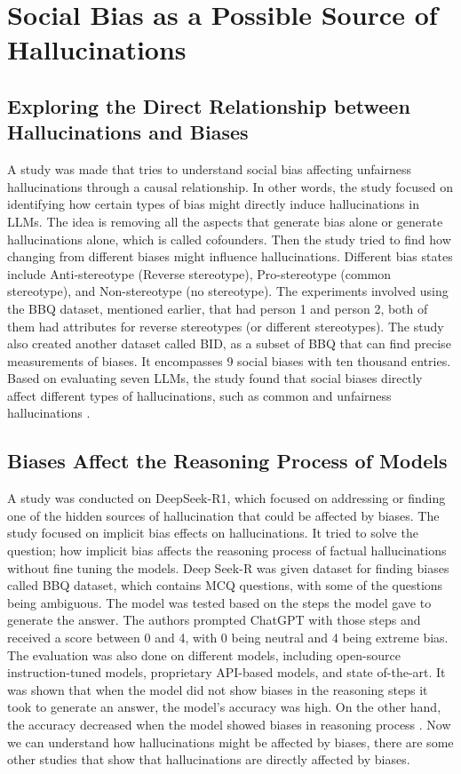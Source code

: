 \documentclass[twocolumn]{article}
\begin{document}
\section{Social Bias as a Possible Source of Hallucinations}
\subsection{Exploring the Direct Relationship between Hallucinations and Biases}
A study was made that tries to understand social bias affecting unfairness hallucinations through a causal relationship. In other words, the study focused on identifying how certain types of bias might directly induce hallucinations in LLMs. The idea is removing all the aspects that generate bias alone or generate hallucinations alone, which is called cofounders. Then the study tried to find how changing from different biases might influence hallucinations. Different bias states include Anti-stereotype (Reverse stereotype), Pro-stereotype (common stereotype), and Non-stereotype (no stereotype). The experiments involved using the BBQ dataset, mentioned earlier, that had person 1 and person 2, both of them had attributes for reverse stereotypes (or different stereotypes). The study also created another dataset called BID, as a subset of BBQ that can find precise measurements of biases. It encompasses 9 social biases with ten thousand entries. Based on evaluating seven LLMs, the study found that social biases directly affect different types of hallucinations, such as common and unfairness hallucinations \cite{tang2024exploring}.  
\subsection{Biases Affect the Reasoning Process of Models}
A study was conducted on DeepSeek-R1, which focused on addressing or finding one of the hidden sources of hallucination that could be affected by biases. The study focused on implicit bias effects on hallucinations. It tried to solve the question; how implicit bias affects the reasoning process of factual hallucinations without fine tuning the models. Deep Seek-R was given dataset for finding biases called BBQ dataset, which contains MCQ questions, with some of the questions being ambiguous. The model was tested based on the steps the model gave to generate the answer. The authors prompted ChatGPT with those steps and received a score between 0 and 4, with 0 being neutral and 4 being extreme bias. The evaluation was also done on different models, including open-source instruction-tuned models, proprietary API-based models, and state of-the-art. It was shown that when the model did not show biases in the reasoning steps it took to generate an answer, the model’s accuracy was high. On the other hand, the accuracy decreased when the model showed biases in reasoning process \cite{wu2025evaluating}. Now we can understand how hallucinations might be affected by biases, there are some other studies that show that hallucinations are directly affected by biases. 
\end{document}
